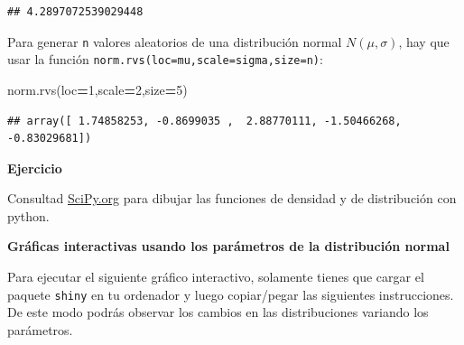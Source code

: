 \documentclass[]{book}
\newenvironment{Shaded}{\begin{snugshade}}{\end{snugshade}}
\newcommand{\DecValTok}[1]{\textcolor[rgb]{0.00,0.00,0.81}{#1}}
\newcommand{\NormalTok}[1]{#1}
\newcommand{\OperatorTok}[1]{\textcolor[rgb]{0.81,0.36,0.00}{\textbf{#1}}}
\begin{document}
\begin{verbatim}
## 4.2897072539029448
\end{verbatim}

Para generar \texttt{n} valores aleatorios de una distribución normal \(N(\mu,\sigma)\), hay que usar la función \texttt{norm.rvs(loc=mu,scale=sigma,size=n)}:

\begin{Shaded}
\begin{Highlighting}[]
\NormalTok{norm.rvs(loc}\OperatorTok{=}\DecValTok{1}\NormalTok{,scale}\OperatorTok{=}\DecValTok{2}\NormalTok{,size}\OperatorTok{=}\DecValTok{5}\NormalTok{)}
\end{Highlighting}
\end{Shaded}

\begin{verbatim}
## array([ 1.74858253, -0.8699035 ,  2.88770111, -1.50466268, -0.83029681])
\end{verbatim}

\textbf{Ejercicio}

Consultad \href{https://docs.scipy.org/doc/scipy/reference/generated/scipy.stats.norm.html}{SciPy.org} para dibujar las funciones de densidad y de distribución con python.

\textbf{Gráficas interactivas usando los parámetros de la distribución normal}

Para ejecutar el siguiente gráfico interactivo, solamente tienes que cargar el paquete \texttt{shiny} en tu ordenador y luego copiar/pegar las siguientes instrucciones. De este modo podrás observar los cambios en las distribuciones variando los parámetros.
\end{document}
